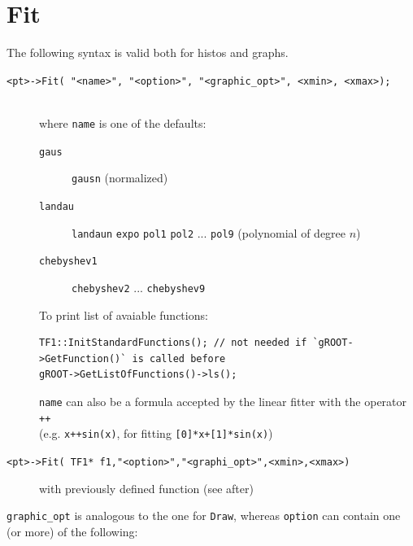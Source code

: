 \documentclass[10pt, twoside]{article}
\newcommand{\ttt}[1]{\colorbox{boxgray}{\texttt{#1}}}
\begin{document}
\section{Fit}
The following syntax is valid both for histos and graphs.
\begin{description}
\item[\ttt{<pt>->Fit( "<name>", "<option>", "<graphic\_opt>", <xmin>, <xmax>);}] \,\\where \ttt{name} is one of the defaults: 
\begin{description}

\item[\ttt{gaus}] \ttt{gausn} (normalized)

\item[\ttt{landau}] \ttt{landaun} \ttt{expo} \ttt{pol1} \ttt{pol2} ... \ttt{pol9} (polynomial of degree $n$)

\item[\ttt{chebyshev1}] \ttt{chebyshev2} ... \ttt{chebyshev9}

\end{description}

To print list of avaiable functions: \begin{verbatim}
TF1::InitStandardFunctions(); // not needed if `gROOT->GetFunction()` is called before
gROOT->GetListOfFunctions()->ls();
\end{verbatim}

\ttt{name} can also be a formula accepted by the linear fitter with the operator \ttt{++}\\
(e.g. \ttt{x++sin(x)}, for fitting \ttt{[0]*x+[1]*sin(x)})
\item[\ttt{<pt>->Fit( TF1* f1,"<option>","<graphi\_opt>",<xmin>,<xmax>)}] with previously defined function (see after)
\end{description}
\ttt{graphic\_opt} is analogous to the one for \ttt{Draw}, whereas \ttt{option} can contain one (or more) of the following:
\end{document}
